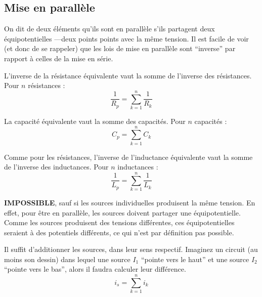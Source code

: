 \documentclass[12pt,a4paper]{article}
\begin{document}
\subsection{Mise en parallèle}
\label{subsubsection: mise en parallele}
On dit de deux éléments qu'ils sont en parallèle s'ils partagent deux équipotentielles ---deux points points avec la même tension. Il est facile de voir (et donc de se rappeler) que les lois de mise en parallèle sont ``inverse'' par rapport à celles de la mise en série.
\begin{boite}
	 L'inverse de la résistance équivalente vaut la somme de l'inverse des résistances. Pour $n$ résistances :
	\begin{equation}
		\frac{1}{R_p} = \sum_{k=1}^n \frac{1}{R_k}
	\end{equation}
\end{boite}
\begin{boite}
	 La capacité équivalente vaut la somme des capacités. Pour $n$ capacités : 
	\begin{equation}
		C_p = \sum_{k=1}^n C_k
	\end{equation}
\end{boite}
\begin{boite}
	 Comme pour les résistances, l'inverse de l'inductance équivalente vaut la somme de l'inverse des inductances. Pour $n$ inductances :
	\begin{equation}
		\frac{1}{L_p} = \sum_{k=1}^n \frac{1}{L_k}
	\end{equation}
\end{boite}
\begin{boite}
	  \textbf{IMPOSSIBLE}, sauf si les sources individuelles produisent la même tension. En effet, pour être en parallèle, les sources doivent partager une équipotentielle. Comme les sources produisent des tensions différentes, ces équipotentielles seraient à des potentiels différents, ce qui n'est par définition pas possible.
\end{boite}
\begin{boite}
	 Il suffit d'additionner les sources, dans leur sens respectif. Imaginez un circuit (au moins son dessin) dans lequel une source $I_1$ ``pointe vers le haut'' et une source $I_2$ ``pointe vers le bas'', alors il faudra calculer leur différence. 
	\begin{equation}
		i_{s} = \sum_{k=1}^n i_k
	\end{equation}
\end{boite}
\end{document}
